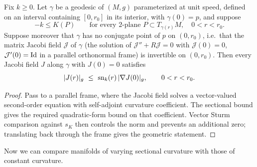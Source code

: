 \begin{lemma}
\label{lem:jacobi-metric-comparison}





Fix $k\ge 0$. Let $\gamma$ be a geodesic of $(M,g)$ parameterized at unit
speed, defined on an interval containing $[0,r_0]$ in its interior, with
$\gamma(0)=p$, and suppose
$$-k\le K(P)\qquad\text{for every $2$-plane }P\subset T_{\gamma(r)}M,\quad
0<r<r_0.$$
Suppose moreover that $\gamma$ has no conjugate point of $p$ on $(0,r_0)$,
i.e.\ that the matrix Jacobi field $\mathcal J$ of $\gamma$ (the solution of
$\mathcal J''+R\mathcal J=0$ with $\mathcal J(0)=0$, $\mathcal J'(0)=\operatorname{Id}$ in a
parallel orthonormal frame) is invertible on $(0,r_0)$. Then every Jacobi
field $J$ along $\gamma$ with $J(0)=0$ satisfies
$$|J(r)|_g\ \le\ \operatorname{sn}_k(r)\,|\nabla J(0)|_g,\qquad 0<r<r_0.$$
\end{lemma}

\begin{proof}
\sketch

Pass to a parallel frame, where the Jacobi field solves a vector-valued second-order equation with self-adjoint curvature coefficient. The sectional bound gives the required quadratic-form bound on that coefficient. Vector Sturm comparison against $s_K$ then controls the norm and prevents an additional zero; translating back through the frame gives the geometric statement.
\end{proof}


Now we can compare manifolds of varying sectional curvature with
those of constant curvature.


